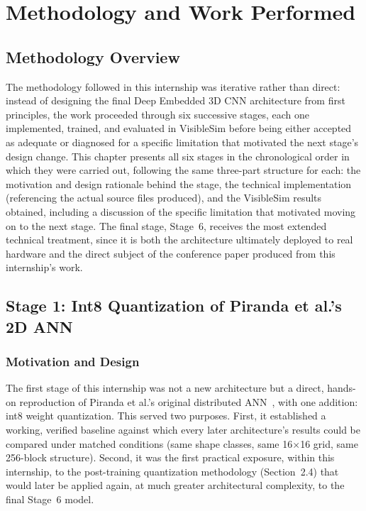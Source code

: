 \documentclass[12pt,a4paper]{report}
\begin{document}
\chapter{Methodology and Work Performed}
\label{ch:methodology}

\section{Methodology Overview}

The methodology followed in this internship was iterative rather than direct: instead of designing the final Deep Embedded 3D CNN architecture from first principles, the work proceeded through six successive stages, each one implemented, trained, and evaluated in VisibleSim before being either accepted as adequate or diagnosed for a specific limitation that motivated the next stage's design change. This chapter presents all six stages in the chronological order in which they were carried out, following the same three-part structure for each: the motivation and design rationale behind the stage, the technical implementation (referencing the actual source files produced), and the VisibleSim results obtained, including a discussion of the specific limitation that motivated moving on to the next stage. The final stage, Stage~6, receives the most extended technical treatment, since it is both the architecture ultimately deployed to real hardware and the direct subject of the conference paper produced from this internship's work.

\section{Stage 1: Int8 Quantization of Piranda et al.'s 2D ANN}
\label{sec:stage1}

\subsection*{Motivation and Design}

The first stage of this internship was not a new architecture but a direct, hands-on reproduction of Piranda et al.'s original distributed ANN~\cite{piranda2024ai4pm}, with one addition: int8 weight quantization. This served two purposes. First, it established a working, verified baseline against which every later architecture's results could be compared under matched conditions (same shape classes, same 16$\times$16 grid, same 256-block structure). Second, it was the first practical exposure, within this internship, to the post-training quantization methodology (Section~2.4) that would later be applied again, at much greater architectural complexity, to the final Stage~6 model.
\end{document}
